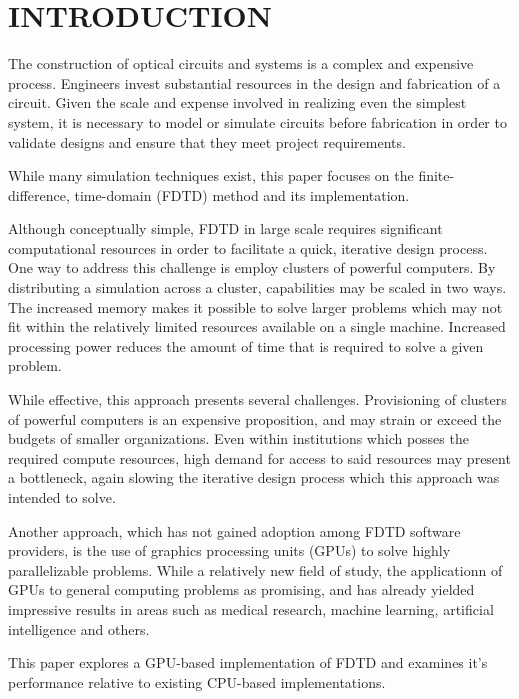 \chapter{INTRODUCTION} \label{ch:introduction}

The construction of optical circuits and systems is a complex and expensive process. Engineers invest substantial resources in the design and fabrication of a circuit. Given the scale and expense involved in realizing even the simplest system, it is necessary to model or simulate circuits before fabrication in order to validate designs and ensure that they meet project requirements.

While many simulation techniques exist, this paper focuses on the finite-difference, time-domain (FDTD) method and its implementation. 

Although conceptually simple, FDTD in large scale requires significant computational resources in order to facilitate a quick, iterative design process. One way to address this challenge is employ clusters of powerful computers. By distributing a simulation across a cluster, capabilities may be scaled in two ways. The increased memory makes it possible to solve larger problems which may not fit within the relatively limited resources available on a single machine. Increased processing power reduces the amount of time that is required to solve a given problem.

While effective, this approach presents several challenges. Provisioning of clusters of powerful computers is an expensive proposition, and may strain or exceed the budgets of smaller organizations. Even within institutions which posses the required compute resources, high demand for access to said resources may present a bottleneck, again slowing the iterative design process which this approach was intended to solve.

Another approach, which has not gained adoption among FDTD software providers, is the use of graphics processing units (GPUs) to solve highly parallelizable problems. While a relatively new field of study, the applicationn of GPUs to general computing problems as promising, and has already yielded impressive results in areas such as medical research, machine learning, artificial intelligence and others. 

This paper explores a GPU-based implementation of FDTD and examines it's performance relative to existing CPU-based implementations. 



 




